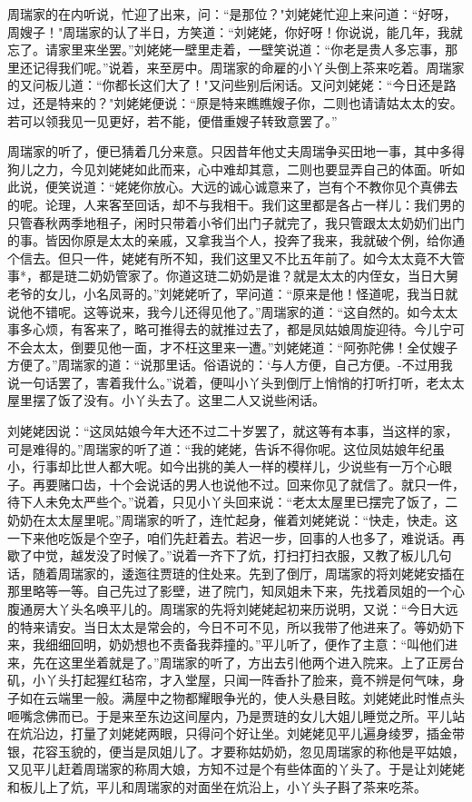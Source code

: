 周瑞家的在内听说，忙迎了出来，问：“是那位？"刘姥姥忙迎上来问道：“好呀，周嫂子！"周瑞家的认了半日，方笑道：“刘姥姥，你好呀！你说说，能几年，我就忘了。请家里来坐罢。”刘姥姥一壁里走着，一壁笑说道：“你老是贵人多忘事，那里还记得我们呢。”说着，来至房中。周瑞家的命雇的小丫头倒上茶来吃着。周瑞家的又问板儿道：“你都长这们大了！"又问些别后闲话。又问刘姥姥：“今日还是路过，还是特来的？"刘姥姥便说：“原是特来瞧瞧嫂子你，二则也请请姑太太的安。若可以领我见一见更好，若不能，便借重嫂子转致意罢了。”

周瑞家的听了，便已猜着几分来意。只因昔年他丈夫周瑞争买田地一事，其中多得狗儿之力，今见刘姥姥如此而来，心中难却其意，二则也要显弄自己的体面。听如此说，便笑说道：“姥姥你放心。大远的诚心诚意来了，岂有个不教你见个真佛去的呢。论理，人来客至回话，却不与我相干。我们这里都是各占一样儿：我们男的只管春秋两季地租子，闲时只带着小爷们出门子就完了，我只管跟太太奶奶们出门的事。皆因你原是太太的亲戚，又拿我当个人，投奔了我来，我就破个例，给你通个信去。但只一件，姥姥有所不知，我们这里又不比五年前了。如今太太竟不大管事*，都是琏二奶奶管家了。你道这琏二奶奶是谁？就是太太的内侄女，当日大舅老爷的女儿，小名凤哥的。”刘姥姥听了，罕问道：“原来是他！怪道呢，我当日就说他不错呢。这等说来，我今儿还得见他了。”周瑞家的道：“这自然的。如今太太事多心烦，有客来了，略可推得去的就推过去了，都是凤姑娘周旋迎待。今儿宁可不会太太，倒要见他一面，才不枉这里来一遭。”刘姥姥道：“阿弥陀佛！全仗嫂子方便了。”周瑞家的道：“说那里话。俗语说的：`与人方便，自己方便。-不过用我说一句话罢了，害着我什么。”说着，便叫小丫头到倒厅上悄悄的打听打听，老太太屋里摆了饭了没有。小丫头去了。这里二人又说些闲话。

刘姥姥因说：“这凤姑娘今年大还不过二十岁罢了，就这等有本事，当这样的家，可是难得的。”周瑞家的听了道：“我的姥姥，告诉不得你呢。这位凤姑娘年纪虽小，行事却比世人都大呢。如今出挑的美人一样的模样儿，少说些有一万个心眼子。再要赌口齿，十个会说话的男人也说他不过。回来你见了就信了。就只一件，待下人未免太严些个。”说着，只见小丫头回来说：“老太太屋里已摆完了饭了，二奶奶在太太屋里呢。”周瑞家的听了，连忙起身，催着刘姥姥说：“快走，快走。这一下来他吃饭是个空子，咱们先赶着去。若迟一步，回事的人也多了，难说话。再歇了中觉，越发没了时候了。”说着一齐下了炕，打扫打扫衣服，又教了板儿几句话，随着周瑞家的，逶迤往贾琏的住处来。先到了倒厅，周瑞家的将刘姥姥安插在那里略等一等。自己先过了影壁，进了院门，知凤姐未下来，先找着凤姐的一个心腹通房大丫头名唤平儿的。周瑞家的先将刘姥姥起初来历说明，又说：“今日大远的特来请安。当日太太是常会的，今日不可不见，所以我带了他进来了。等奶奶下来，我细细回明，奶奶想也不责备我莽撞的。”平儿听了，便作了主意：“叫他们进来，先在这里坐着就是了。”周瑞家的听了，方出去引他两个进入院来。上了正房台矶，小丫头打起猩红毡帘，才入堂屋，只闻一阵香扑了脸来，竟不辨是何气味，身子如在云端里一般。满屋中之物都耀眼争光的，使人头悬目眩。刘姥姥此时惟点头咂嘴念佛而已。于是来至东边这间屋内，乃是贾琏的女儿大姐儿睡觉之所。平儿站在炕沿边，打量了刘姥姥两眼，只得问个好让坐。刘姥姥见平儿遍身绫罗，插金带银，花容玉貌的，便当是凤姐儿了。才要称姑奶奶，忽见周瑞家的称他是平姑娘，又见平儿赶着周瑞家的称周大娘，方知不过是个有些体面的丫头了。于是让刘姥姥和板儿上了炕，平儿和周瑞家的对面坐在炕沿上，小丫头子斟了茶来吃茶。

